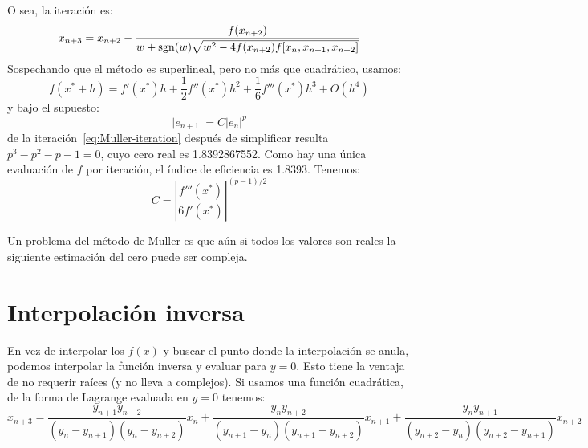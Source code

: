   O sea,
  la iteración es:
  \begin{equation}
    \label{eq:Muller-iteration}
    x_{n + 3}
      = x_{n + 2}
         - \frac{f(x_{n + 2})}
               {w + \operatorname{sgn}(w)
                      \sqrt{w^2
                              - 4 f(x_{n + 2}) f[x_n, x_{n + 1}, x_{n + 2}]}}
  \end{equation}
  Sospechando que el método es superlineal,
  pero no más que cuadrático,
  usamos:
  \begin{equation*}
    f(x^* + h)
      = f'(x^*) h
          + \frac{1}{2} f''(x^*) h^2
          + \frac{1}{6} f'''(x^*) h^3
          + O(h^4)
  \end{equation*}
  y bajo el supuesto:
  \begin{equation*}
    \lvert e_{n + 1} \rvert
      = C \rvert e_n \lvert^p
  \end{equation*}
  de la iteración~\eqref{eq:Muller-iteration}
  después de simplificar
  resulta \(p^3 - p^2 - p - 1 = 0\),
  cuyo cero real es \num{1,8392867552}.
  Como hay una única evaluación de \(f\) por iteración,
  el índice de eficiencia es \num{1,8393}.
  Tenemos:
  \begin{equation}
    C
      = \left\lvert \frac{f'''(x^*)}{6 f'(x^*)} \right\rvert^{(p - 1) / 2}
  \end{equation}

  Un problema del método de Muller
  es que aún si todos los valores son reales
  la siguiente estimación del cero puede ser compleja.

\section{Interpolación inversa}
\label{sec:interpolacion-inversa}

  En vez de interpolar los \(f(x)\)
  y buscar el punto donde la interpolación se anula,
  podemos interpolar la función inversa y evaluar para \(y = 0\).
  Esto tiene la ventaja de no requerir raíces
  (y no lleva a complejos).
  Si usamos una función cuadrática,
  de la forma de Lagrange evaluada en \(y = 0\) tenemos:
  \begin{equation}
    \label{eq:inverse-interpolation-iteration}
    x_{n + 3}
      = \frac{y_{n + 1} y_{n + 2}}
             {(y_n - y_{n + 1}) (y_n - y_{n + 2})} x_n
          + \frac{y_n y_{n + 2}}
                 {(y_{n + 1} - y_n) (y_{n + 1} - y_{n + 2})} x_{n + 1}
          + \frac{y_n y_{n + 1}}
                 {(y_{n + 2} - y_n) (y_{n + 2} - y_{n + 1})} x_{n + 2}
  \end{equation}

